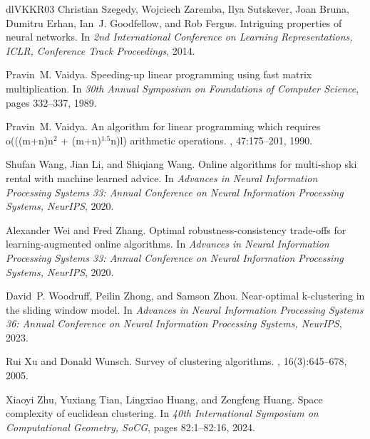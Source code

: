 \documentclass[10pt,a4paper]{amsart}
\begin{document}
\begin{thebibliography}{dlVKKR03}
Christian Szegedy, Wojciech Zaremba, Ilya Sutskever, Joan Bruna, Dumitru Erhan, Ian~J. Goodfellow, and Rob Fergus.
\newblock Intriguing properties of neural networks.
\newblock In {\em 2nd International Conference on Learning Representations, {ICLR}, Conference Track Proceedings}, 2014.

Pravin~M. Vaidya.
\newblock Speeding-up linear programming using fast matrix multiplication.
\newblock In {\em 30th Annual Symposium on Foundations of Computer Science}, pages 332--337, 1989.

Pravin~M. Vaidya.
\newblock An algorithm for linear programming which requires o(((m+n)n\({}^{\mbox{2}}\) + (m+n)\({}^{\mbox{1.5}}\)n)l) arithmetic operations.
, 47:175--201, 1990.

Shufan Wang, Jian Li, and Shiqiang Wang.
\newblock Online algorithms for multi-shop ski rental with machine learned advice.
\newblock In {\em Advances in Neural Information Processing Systems 33: Annual Conference on Neural Information Processing Systems, NeurIPS}, 2020.

Alexander Wei and Fred Zhang.
\newblock Optimal robustness-consistency trade-offs for learning-augmented online algorithms.
\newblock In {\em Advances in Neural Information Processing Systems 33: Annual Conference on Neural Information Processing Systems, NeurIPS}, 2020.

David~P. Woodruff, Peilin Zhong, and Samson Zhou.
\newblock Near-optimal k-clustering in the sliding window model.
\newblock In {\em Advances in Neural Information Processing Systems 36: Annual Conference on Neural Information Processing Systems, NeurIPS}, 2023.

Rui Xu and Donald Wunsch.
\newblock Survey of clustering algorithms.
, 16(3):645--678, 2005.

Xiaoyi Zhu, Yuxiang Tian, Lingxiao Huang, and Zengfeng Huang.
\newblock Space complexity of euclidean clustering.
\newblock In {\em 40th International Symposium on Computational Geometry, SoCG}, pages 82:1--82:16, 2024.

\end{thebibliography}
\end{document}
